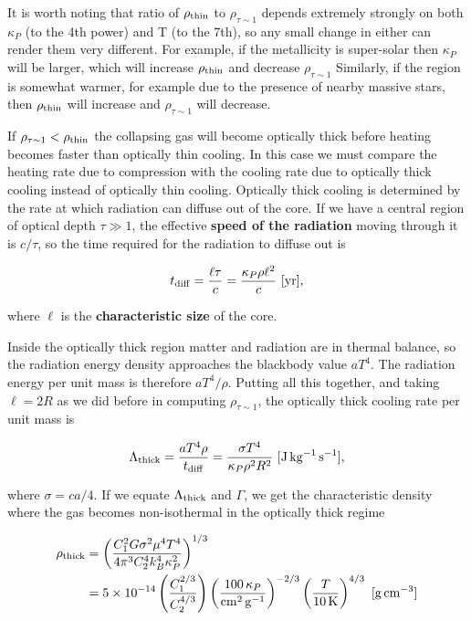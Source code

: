 \documentclass[a4paper,10pt]{article}
\begin{document}
{\noindent}It is worth noting that ratio of $\rho_{\rm thin}$ to $\rho_{\tau\sim1}$ depends extremely strongly on both $\kappa_P$ (to the 4th power) and T (to the 7th), so any small change in either can render them very different. For example, if the metallicity is super-solar then $\kappa_P$ will be larger, which will increase $\rho_{\rm thin}$ and decrease $\rho_{\tau\sim1}$ Similarly, if the region is somewhat warmer, for example due to the presence of nearby massive stars, then $\rho_{\rm thin}$ will increase and $\rho_{\tau\sim1}$ will decrease.

{\noindent}If $\rho_{\tau\sim1}<\rho_{\rm thin}$ the collapsing gas will become optically thick before heating becomes faster than optically thin cooling. In this case we must compare the heating rate due to compression with the cooling rate due to optically thick cooling instead of optically thin cooling. Optically thick cooling is determined by the rate at which radiation can diffuse out of the core. If we have a central region of optical depth $\tau\gg1$, the effective \textbf{speed of the radiation} moving through it is $c/\tau$, so the time required for the radiation to diffuse out is

\begin{align*}
    t_{\rm diff} = \frac{\ell\tau}{c} = \frac{\kappa_P\rho\ell^2}{c} ~ [{\rm yr}],
\end{align*}

{\noindent}where $\ell$ is the \textbf{characteristic size} of the core.

{\noindent}Inside the optically thick region matter and radiation are in thermal balance, so the radiation energy density approaches the blackbody value $aT^4$. The radiation energy per unit mass is therefore $aT^4/\rho$. Putting all this together, and taking $\ell=2R$ as we did before in computing $\rho_{\tau\sim1}$, the optically thick cooling rate per unit mass is

\begin{align*}
    \Lambda_{\rm thick} = \frac{aT^4\rho}{t_{\rm diff}} = \frac{\sigma T^4}{\kappa_P\rho^2R^2} ~ [{\rm J\,kg^{-1}\,s^{-1}}],
\end{align*}

{\noindent}where $\sigma=ca/4$. If we equate $\Lambda_{\rm thick}$ and $\Gamma$, we get the characteristic density where the gas becomes non-isothermal in the optically thick regime

\begin{align*}
    \rho_{\rm thick} &= \left(\frac{C_1^2G\sigma^2\mu^4T^4}{4\pi^3C_2^4k_B^4\kappa_P^2}\right)^{1/3} \\
    &= 5\times10^{-14} \left(\frac{C_1^{2/3}}{C_2^{4/3}}\right) \left(\frac{100\,\kappa_P}{{\rm cm^2\,g^{-1}}}\right)^{-2/3} \left(\frac{T}{10\,{\rm K}}\right)^{4/3} ~ [{\rm g\,cm^{-3}}]
\end{align*}
\end{document}
